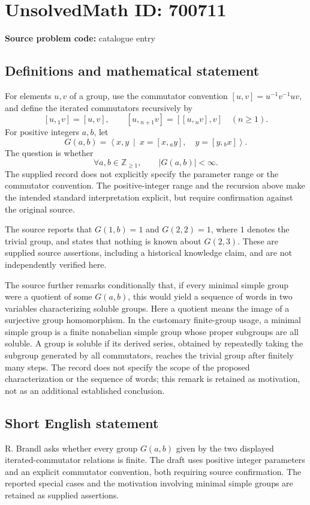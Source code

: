 \documentclass[11pt]{article}
\newcommand{\Z}{\mathbb{Z}}
\begin{document}
\section*{UnsolvedMath ID: 700711}
\textbf{Source problem code:} catalogue entry
\subsection{Definitions and mathematical statement}
For elements \(u,v\) of a group, use the commutator convention \([u,v]=u^{-1}v^{-1}uv\), and define the iterated commutators recursively by
\[
[u,{}_1v]=[u,v],\qquad [u,{}_{n+1}v]=[[u,{}_nv],v]\quad(n\geq 1).
\]
For positive integers \(a,b\), let
\[
G(a,b)=\left\langle x,y\ \middle|\ x=[x,{}_a y],\quad y=[y,{}_b x]\right\rangle.
\]
The question is whether
\[
\forall a,b\in\Z_{\geq 1},\qquad |G(a,b)|<\infty.
\]
The supplied record does not explicitly specify the parameter range or the commutator convention. The positive-integer range and the recursion above make the intended standard interpretation explicit, but require confirmation against the original source.

The source reports that \(G(1,b)=1\) and \(G(2,2)=1\), where \(1\) denotes the trivial group, and states that nothing is known about \(G(2,3)\). These are supplied source assertions, including a historical knowledge claim, and are not independently verified here.

The source further remarks conditionally that, if every minimal simple group were a quotient of some \(G(a,b)\), this would yield a sequence of words in two variables characterizing soluble groups. Here a quotient means the image of a surjective group homomorphism. In the customary finite-group usage, a minimal simple group is a finite nonabelian simple group whose proper subgroups are all soluble. A group is soluble if its derived series, obtained by repeatedly taking the subgroup generated by all commutators, reaches the trivial group after finitely many steps. The record does not specify the scope of the proposed characterization or the sequence of words; this remark is retained as motivation, not as an additional established conclusion.
\subsection{Short English statement}
R. Brandl asks whether every group \(G(a,b)\) given by the two displayed iterated-commutator relations is finite. The draft uses positive integer parameters and an explicit commutator convention, both requiring source confirmation. The reported special cases and the motivation involving minimal simple groups are retained as supplied assertions.
\end{document}
